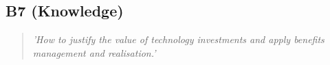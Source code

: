 \subsection{B7 (Knowledge)}

  \begin{quote}
    \textit{'How to justify the value of technology
    investments and apply benefits management and
    realisation.'}
  \end{quote}

\newpage